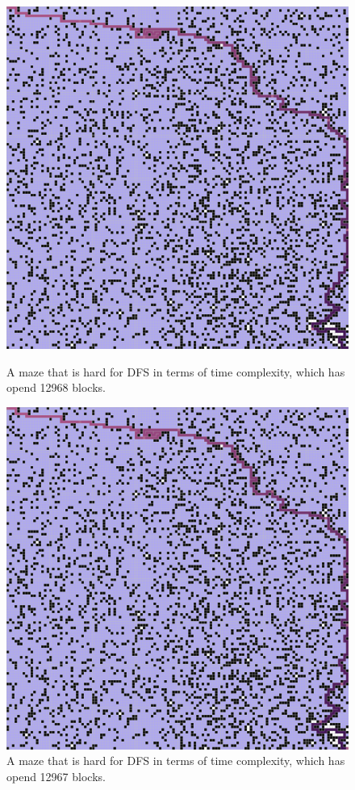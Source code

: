 \documentclass[letter]{article}
\begin{document}
\begin{enumerate}[resume]
\begin{enumerate}
\begin{enumerate}
\begin{figure}
					\includegraphics[width=\textwidth]{../pics/db/12968.png}
					\caption{\label{fig:db2}A maze that is hard for DFS in terms of time complexity, which has opend 12968 blocks.}
					\endminipage\hfill
					\includegraphics[width=\textwidth]{../pics/db/12967.png}
					\caption{\label{fig:db3} A maze that is hard for DFS in terms of time complexity, which has opend 12967 blocks.}
					\endminipage
					\endminipage 
				\end{figure}
				

\end{enumerate}
\end{enumerate}
\end{enumerate}
\end{document}
